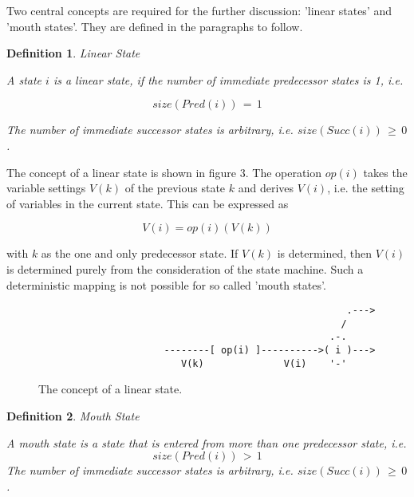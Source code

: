 \documentclass[12pt,a4paper]{scrartcl}
\newtheorem{definition}{Definition}
\begin{document}
Two central concepts are required for the further discussion: 'linear states' and 'mouth
states'.  They are defined in the paragraphs to follow. 

\begin{definition}
Linear State

A state $i$ is a linear state, if the number of immediate predecessor states is
1, i.e. 

\begin{equation}
                           size(Pred(i))\,=\,1
\end{equation}

The number of immediate successor states is arbitrary, i.e.
$size(Succ(i))\,\ge\,0$.

\end{definition}

The concept of a linear state is shown in figure 3. The operation $op(i)$ takes
the variable settings $V(k)$ of the previous state $k$ and derives $V(i)$, i.e.
the setting of variables in the current state. This can be expressed as 

\begin{equation} \label{eq:accumulation}
            V(i) = op(i)(V(k))                                         
\end{equation}

with $k$ as the one and only predecessor state. If $V(k)$ is determined, then
$V(i)$ is determined purely from the consideration of the state machine. Such a
deterministic mapping is not possible for so called 'mouth states'.

\begin{figure}[htbp] \leavevmode
\begin{verbatim}
                                                      .---> 
                                                     /
                                                   .-.
                      --------[ op(i) ]---------->( i )---> 
                         V(k)              V(i)    '-'

\end{verbatim}
\caption{The concept of a linear state.}
\end{figure}

\begin{definition}
Mouth State

A mouth state is a state that is entered from more than one predecessor 
state, i.e.
\begin{equation}
                           size(Pred(i))\,>\,1
\end{equation}
The number of immediate successor states is arbitrary, i.e. $size(Succ(i))\,\ge\,0$.

\end{definition}
    
\end{document}
